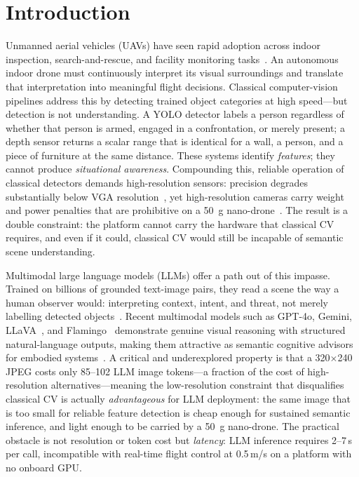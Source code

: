 \documentclass[journal]{IEEEtran}
\begin{document}
\section{Introduction}
\label{sec:intro}

Unmanned aerial vehicles (UAVs) have seen rapid adoption across indoor
inspection, search-and-rescue, and facility monitoring
tasks~\cite{shakhatreh2019uav,floreano2015science}.
An autonomous indoor drone must continuously interpret its visual surroundings
and translate that interpretation into meaningful flight decisions.
Classical computer-vision pipelines address this by detecting trained object
categories at high speed---but detection is not understanding.
A YOLO detector labels a person regardless of whether that person is armed,
engaged in a confrontation, or merely present; a depth sensor returns a scalar
range that is identical for a wall, a person, and a piece of furniture at the
same distance.
These systems identify \emph{features}; they cannot produce \emph{situational
awareness}.
Compounding this, reliable operation of classical detectors demands
high-resolution sensors: precision degrades substantially below VGA
resolution~\cite{kim2024yoloihd}, yet high-resolution cameras carry weight and
power penalties that are prohibitive on a \SI{50}{\gram}
nano-drone~\cite{palossi2019nanotas,floreano2015science}.
The result is a double constraint: the platform cannot carry the hardware that
classical CV requires, and even if it could, classical CV would still be
incapable of semantic scene understanding.

Multimodal large language models (LLMs) offer a path out of this impasse.
Trained on billions of grounded text-image pairs, they read a scene the way
a human observer would: interpreting context, intent, and threat, not merely
labelling detected objects~\cite{vemprala2023chatgpt,ahn2022saycan,driess2023palme}.
Recent multimodal models such as GPT-4o, Gemini, LLaVA~\cite{liu2023llava},
and Flamingo~\cite{alayrac2022flamingo} demonstrate genuine visual reasoning
with structured natural-language outputs, making them attractive as semantic
cognitive advisors for embodied systems~\cite{driess2023palme,ahn2022saycan}.
A critical and underexplored property is that a 320$\times$240 JPEG costs only
85--102 LLM image tokens---a fraction of the cost of high-resolution
alternatives---meaning the low-resolution constraint that disqualifies classical
CV is actually \emph{advantageous} for LLM deployment: the same image that is
too small for reliable feature detection is cheap enough for sustained semantic
inference, and light enough to be carried by a \SI{50}{\gram} nano-drone.
The practical obstacle is not resolution or token cost but \emph{latency}:
LLM inference requires 2--7\,s per call, incompatible with real-time flight
control at 0.5\,m/s on a platform with no onboard GPU.
\end{document}
